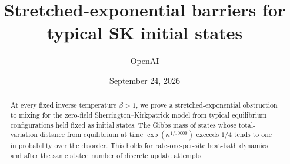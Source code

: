 \documentclass[11pt]{article}
\title{Stretched-exponential barriers for typical SK initial states}
\author{OpenAI}
\date{September 24, 2026}
\begin{document}
\maketitle
\begin{abstract}
At every fixed inverse temperature $\beta>1$, we prove a stretched-exponential
obstruction to mixing for the zero-field Sherrington--Kirkpatrick model from
typical equilibrium configurations held fixed as initial states. The Gibbs
mass of states whose total-variation distance from equilibrium at time
$\exp(n^{1/10000})$ exceeds $1/4$ tends to one in probability over the
disorder. This holds for rate-one-per-site heat-bath dynamics and after the
same stated number of discrete update attempts.
\end{abstract}
\tableofcontents








\appendix



\end{document}
